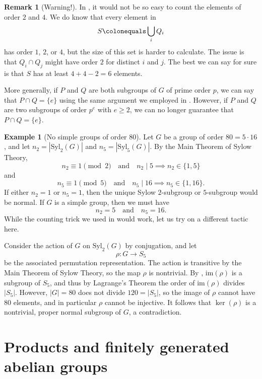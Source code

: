 \documentclass[12pt]{report}
\numberwithin{equation}{section}
\numberwithin{theorem}{chapter}
\theoremstyle{definition}
\newtheorem{example}[theorem]{Example}
\newtheorem*{basic properties}{Basic Properties}
\newtheorem*{Important Remark}{Important Remark}
\newtheorem{remark}[theorem]{Remark}
\renewcommand{\ker}{\operatorname{ker}}
\begin{document}
\begin{remark}[Warning!]
In , it would not be so easy to count the elements of order $2$ and $4$. We do know that every element in 
$$S \colonequals \bigcup_i Q_i$$ 
has order $1$, $2$, or $4$, but the size of this set is harder to calculate. The issue is that $Q_i \cap Q_j$ might have order $2$ for distinct $i$ and $j$. The best we can say for sure is that $S$ has at least $4 + 4 - 2 = 6$ elements.
\end{remark}


More generally, if $P$ and $Q$ are both subgroups of $G$ of prime order $p$, we can say that $P \cap Q = \{ e \}$ using the same argument we employed in . However, if $P$ and $Q$ are two subgroups of order $p^e$ with $e \geqslant 2$, we can no longer guarantee that $P \cap Q = \{ e \}$.


\begin{example}[No simple groups of order $80$]
Let $G$ be a group of order $80=5 \cdot 16$, and let $n_2 = |\mathrm{Syl}_2(G)|$ and $n_5 = |\mathrm{Syl}_5(G)|$. By the Main Theorem of Sylow Theory,
$$n_2 \equiv 1 \!\!\pmod 2 \quad \text{and} \quad n_2 \mid 5 \implies n_2 \in \{1, 5\}$$
and
$$n_5 \equiv 1 \!\!\pmod 5 \quad \text{and} \quad n_5 \mid 16 \implies n_5 \in \{1, 16\}.$$
If either $n_2 = 1$ or $n_5=1$, then the unique Sylow $2$-subgroup or $5$-subgroup would be normal. If $G$ is a simple group, then we must have
$$n_2 = 5 \quad \text{and} \quad n_5 = 16.$$
While the counting trick we used in  would work, let us try on a different tactic here. 

Consider the action of $G$ on $\mathrm{Syl}_2(G)$ by conjugation, and let
$$\rho\!: G \to S_5$$
be the associated permutation representation. The action is transitive by the Main Theorem of Sylow Theory, so the map $\rho$ is nontrivial. By , $\mathrm{im}(\rho)$ is a subgroup of $S_5$, and thus by Lagrange's Theorem the order of $\mathrm{im}(\rho)$ divides $|S_5|$. However, $|G|=80$ does not divide $120 = |S_5|$, so the image of $\rho$ cannot have $80$ elements, and in particular $\rho$ cannot be injective. It follows that $\ker(\rho)$ is a nontrivial, proper normal subgroup of $G$, a contradiction.
\end{example}







\chapter{Products and finitely generated abelian groups}
\end{document}
